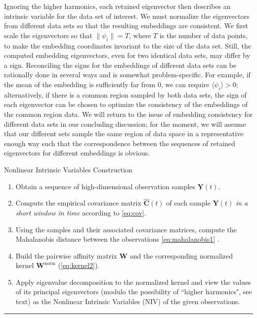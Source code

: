 Ignoring the higher harmonics, each retained eigenvector then describes an intrinsic variable for the data set of interest.
%
We must normalize the eigenvectors from different data sets so that the resulting embeddings are consistent.
%
We first scale the eigenvectors so that $\|\psi_i\| = T$, where $T$ is the number of data points,
to make the embedding coordinates invariant to the size of the data set.
%
Still, the computed embedding eigenvectors, even for two identical data sets, may differ by a sign.
%
Reconciling the signs for the embeddings of different data sets can be rationally done in several ways and is somewhat problem-specific.
%
For example, if the mean of the embedding is sufficiently far from 0, we can require $\langle \psi_i \rangle > 0$;
alternatively, if there is a common region sampled by both data sets, the sign of each eigenvector can be chosen to optimize the consistency of the embeddings of the common region data.
%
We will return to the issue of embedding consistency for different data sets in our concluding discussion; for the moment,
we will assume that our different sets sample the same region of data space in a representative enough way such that the
correspondence between the sequences of retained eigenvectors for different embeddings is obvious.

\begin{algorithm}[th!]
\caption{Nonlinear Intrinsic Variables Construction}
\begin{enumerate}

\item
Obtain a sequence of high-dimensional observation samples $\mathbf{Y}(t)$.

\item
Compute the empirical covariance matrix $\widehat{\mathbf{C}}(t)$ of each sample $\mathbf{Y}(t)$ {\em in a short window in time} according to \eqref{eq:cov}.

\item
Using the samples and their associated covariance matrices, compute the Mahalanobis distance between the observations \eqref{eq:mahalanobis1} .

\item
Build the pairwise affinity matrix $\mathbf{W}$ and the corresponding normalized kernel $\mathbf{W}^{\mathrm{norm}}$ (\ref{eq:kernel2}).

\item
Apply eigenvalue decomposition to the normalized kernel and view the values of its principal eigenvectors (modulo the possibility of
 ``higher harmonics", see text) as the Nonlinear Intrinsic Variables (NIV) of the given observations.

\end{enumerate}
\hrule
\label{algo}
\end{algorithm}

